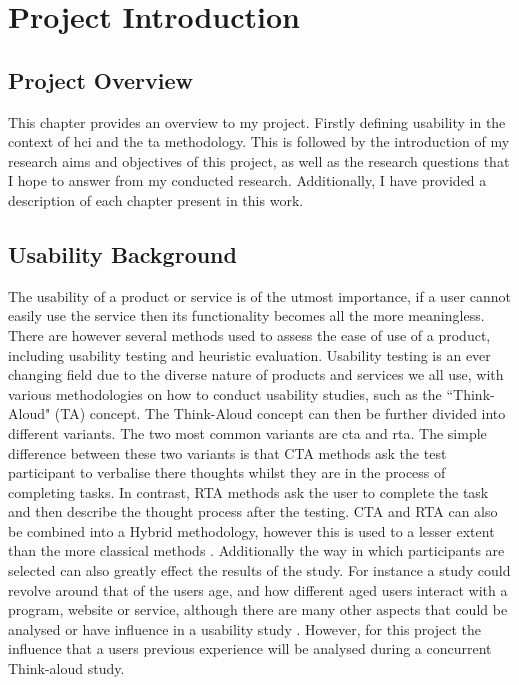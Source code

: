 \chapter{Project Introduction}
\section{Project Overview}
This chapter provides an overview to my project. Firstly defining usability in the context of \gls{hci} and the \gls{ta} methodology. This is followed by the introduction of my research aims and objectives of this project, as well as the research questions that I hope to answer from my conducted research. Additionally, I have provided a description of each chapter present in this work.

\section{Usability Background}
The usability of a product or service is of the utmost importance, if a user cannot easily use the service then its functionality becomes all the more meaningless. There are however several methods used to assess the ease of use of a product, including usability testing and heuristic evaluation. Usability testing is an ever changing field due to the diverse nature of products and services we all use, with various methodologies on how to conduct usability studies, such as the ``Think-Aloud" (TA) concept. The Think-Aloud concept can then be further divided into different variants. The two most common variants are \gls{cta} and \gls{rta}. The simple difference between these two variants is that CTA methods ask the test participant to verbalise there thoughts whilst they are in the process of completing tasks. In contrast, RTA methods ask the user to complete the task and then describe the thought process after the testing. CTA and RTA can also be combined into a Hybrid methodology, however this is used to a lesser extent than the more classical methods \citep{alhadreti2016thinking}. Additionally the way in which participants are selected can also greatly effect the results of the study. For instance a study could revolve around that of the users age, and how different aged users interact with a program, website or service, although there are many other aspects that could be analysed or have influence in a usability study \citep{rubin2008handbook}. However, for this project the influence that a users previous experience will be analysed during a concurrent Think-aloud study. 


